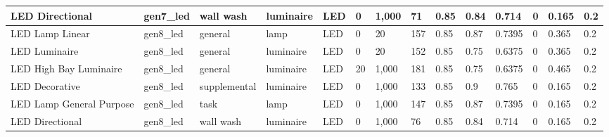 \begin{center}
\begin{landscape}
\begin{longtable}{|p{0.75in}|p{0.65in}|p{0.47in}|p{0.4in}|p{0.45in}|p{0.4in}|p{0.4in}|p{0.4in}|p{0.4in}|p{0.4in}|p{0.4in}|p{0.4in}|p{0.4in}|p{0.4in}|}
  LED Directional            & gen7\_led               & wall wash              & luminaire     & LED                     & 0                     & 1,000                  & 71                              & 0.85                    & 0.84                        & 0.714                & 0                   & 0.165            & 0.2              \\ \hline
  LED Lamp Linear            & gen8\_led               & general                & lamp          & LED                     & 0                     & 20                    & 157                             & 0.85                    & 0.87                        & 0.7395               & 0                   & 0.365            & 0.2              \\ \hline
  LED Luminaire              & gen8\_led               & general                & luminaire     & LED                     & 0                     & 20                    & 152                             & 0.85                    & 0.75                        & 0.6375               & 0                   & 0.365            & 0.2              \\ \hline
  LED High Bay Luminaire     & gen8\_led               & general                & luminaire     & LED                     & 20                    & 1,000                  & 181                             & 0.85                    & 0.75                        & 0.6375               & 0                   & 0.465            & 0.2              \\ \hline
  LED Decorative             & gen8\_led               & supplemental           & luminaire     & LED                     & 0                     & 1,000                  & 133                             & 0.85                    & 0.9                         & 0.765                & 0                   & 0.165            & 0.2              \\ \hline
  LED Lamp General Purpose   & gen8\_led               & task                   & lamp          & LED                     & 0                     & 1,000                  & 147                             & 0.85                    & 0.87                        & 0.7395               & 0                   & 0.165            & 0.2              \\ \hline
  LED Directional            & gen8\_led               & wall wash              & luminaire     & LED                     & 0                     & 1,000                  & 76                              & 0.85                    & 0.84                        & 0.714                & 0                   & 0.165            & 0.2              \\ \hline

\end{longtable}
\end{landscape}
\end{center}
